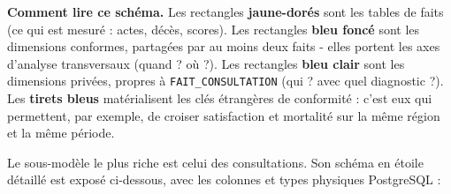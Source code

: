 \documentclass[12pt,a4paper]{report}
\begin{document}
\textbf{Comment lire ce schéma.} Les rectangles \textcolor{medalor!80!black}{\textbf{jaune-dorés}} sont les tables de faits (ce qui est mesuré : actes, décès, scores). Les rectangles \textcolor{cesiblue}{\textbf{bleu foncé}} sont les dimensions conformes, partagées par au moins deux faits - elles portent les axes d'analyse transversaux (quand ? où ?). Les rectangles \textcolor{cesiblue!55}{\textbf{bleu clair}} sont les dimensions privées, propres à \texttt{FAIT\_CONSULTATION} (qui ? avec quel diagnostic ?). Les \textbf{tirets bleus} matérialisent les clés étrangères de conformité : c'est eux qui permettent, par exemple, de croiser satisfaction et mortalité sur la même région et la même période.

Le sous-modèle le plus riche est celui des consultations. Son schéma en étoile détaillé est exposé ci-dessous, avec les colonnes et types physiques PostgreSQL :
\end{document}
